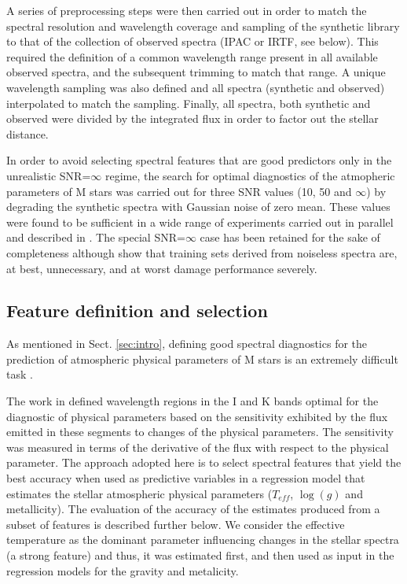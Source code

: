 A series of preprocessing steps were then carried out in order to
match the spectral resolution and wavelength coverage and sampling of
the synthetic library to that of the collection of observed spectra
(IPAC or IRTF, see below). This required the definition of a common
wavelength range present in all available observed spectra, and the
subsequent trimming to match that range. A unique wavelength sampling
was also defined and all spectra (synthetic and observed) interpolated
to match the sampling. Finally, all spectra, both synthetic and
observed were divided by the integrated flux in order to factor out
the stellar distance.

In order to avoid selecting spectral features that are good predictors
only in the unrealistic SNR=$\infty$ regime, the search for optimal
diagnostics of the atmopheric parameters of M stars was carried out
for three SNR values (10, 50 and $\infty$) by degrading the synthetic
spectra with Gaussian noise of zero mean. These values were found to
be sufficient in a wide range of experiments carried out in parallel
and described in \cite{PaperAna}. The special SNR=$\infty$ case has
been retained for the sake of completeness although \cite{} show that
training sets derived from noiseless spectra are, at best,
unnecessary, and at worst damage performance severely.

\subsection{Feature definition and selection}
\label{subsec:FD}

As mentioned in Sect. \ref{sec:intro}, defining good spectral
diagnostics for the prediction of atmospheric physical parameters of M
stars is an extremely difficult task .

The work in \cite{cesetti} defined wavelength regions in the I and K
bands optimal for the diagnostic of physical parameters based on the
sensitivity exhibited by the flux emitted in these segments to changes
of the physical parameters. The sensitivity was measured in terms of
the derivative of the flux with respect to the physical parameter. The
approach adopted here is to select spectral features that yield the
best accuracy when used as predictive variables in a regression model
that estimates the stellar atmospheric physical parameters ($T_{eff}$,
$\log(g)$ and metallicity). The evaluation of the accuracy of the
estimates produced from a subset of features is described further
below. We consider the effective temperature as the dominant parameter
influencing changes in the stellar spectra (a strong feature) and
thus, it was estimated first, and then used as input in the regression
models for the gravity and metalicity.

